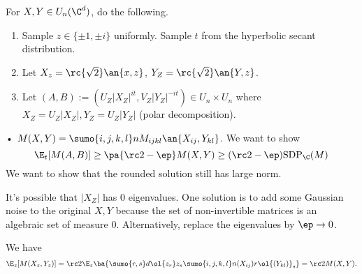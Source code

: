 

For $X,Y\in U_n(\C^d)$, do the following.
\begin{enumerate}
\item
Sample $z\in \{\pm 1,\pm i\}$ uniformly. Sample $t$ from the hyperbolic secant distribution.
\item
Let $X_z=\rc{\sqrt 2}\an{x,z}$, $Y_Z=\rc{\sqrt 2} \an{Y,z}$.
\item
Let $(A,B):=(U_Z|X_Z|^{it}, V_Z|Y_Z|^{-it})\in U_n\times U_n$ where $X_Z=U_Z|X_Z|, Y_Z=U_Z|Y_Z|$ (polar decomposition).
\end{enumerate}•
$M(X,Y)= \sumo{i,j,k,l}n M_{ijkl} \an{X_{ij},Y_{kl}}$. We want to show
\[
\E_t[M(A,B)] \ge \pa{\rc 2-\ep} M(X,Y) \ge (\rc2 - \ep)\text{SDP}_\C(M)
\]
We want to show that the rounded solution still has large norm.

It's possible that $|X_Z|$ has 0 eigenvalues. One solution is to add some Gaussian noise to the original $X,Y$ because the set of non-invertible matrices is an algebraic set of measure 0. Alternatively, replace the eigenvalues by $\ep\to 0$.

We have
\[
\E_z[M(X_z,Y_z)] = \rc 2 \E_z \ba{
\sumo{r,s}d \ol{z_r} z_s \sumo{i,j,k,l}n (X_{ij})r\ol{(Y_{kl})}_s
}=\rc 2 M(X,Y).
\]

